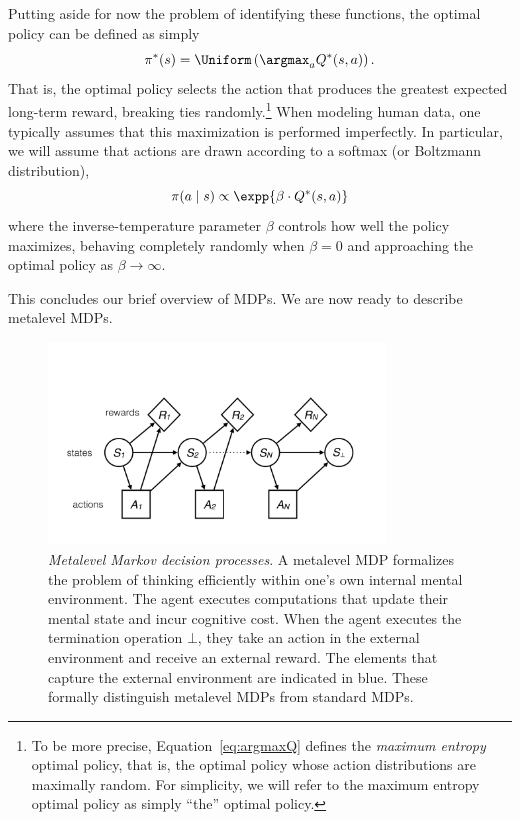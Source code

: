 Putting aside for now the problem of identifying these functions, the optimal policy can be defined as simply
%
\begin{equation}\label{eq:argmaxQ}
  \pi^*(s) = \Uniform\left(\argmax_a Q^*(s, a)\right).
\end{equation}
%
That is, the optimal policy selects the action that produces the greatest expected long-term reward, breaking ties randomly.\footnote{%
  To be more precise, Equation~\ref{eq:argmaxQ} defines the \emph{maximum entropy} optimal policy, that is, the optimal policy whose action distributions are maximally random. For simplicity, we will refer to the maximum entropy optimal policy as simply ``the'' optimal policy.
} When modeling human data, one typically assumes that this maximization is performed imperfectly. In particular, we will assume that actions are drawn according to a softmax (or Boltzmann distribution),
%
\begin{equation}\label{eq:softoptimal}
  \pi(a \mid s) \propto \expp{\beta \cdot Q^*(s, a)}
\end{equation}
%
where the inverse-temperature parameter $\beta$ controls how well the policy maximizes, behaving completely randomly when $\beta = 0$ and approaching the optimal policy as $\beta \rightarrow \infty$.

This concludes our brief overview of MDPs. We are now ready to describe metalevel MDPs.


\begin{figure}
  \centering
  \includegraphics[width=0.8\textwidth,page=2,trim=0 100 0 50]{diagrams/metamdp.pdf}
  \caption{\emph{Metalevel Markov decision processes}. A metalevel MDP formalizes the problem of thinking efficiently within one's own internal mental environment. The agent executes computations that update their mental state and incur cognitive cost. When the agent executes the termination operation $\bot$, they take an action in the external environment and receive an external reward. The elements that capture the external environment are indicated in blue. These formally distinguish metalevel MDPs from standard MDPs.
  }
  \label{fig:metamdp-diagram}
\end{figure}



